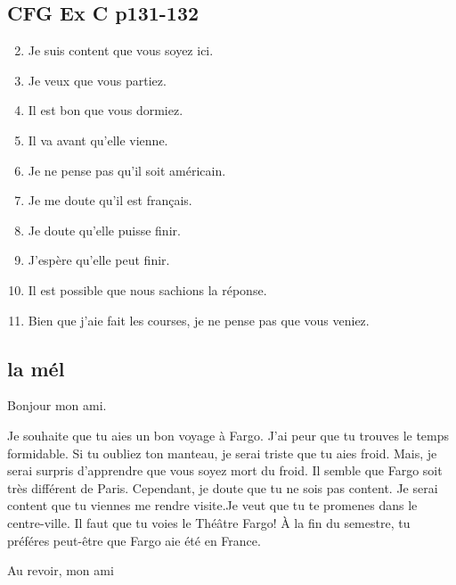 \documentclass[letterpaper]{article}
\begin{document}
\doublespacing
\subsection*{CFG Ex C p131-132}
\begin{enumerate}
\setcounter{enumi}{1}
\item
Je suis content que vous soyez ici.
\setcounter{enumi}{3}
\item
Je veux que vous partiez.
\setcounter{enumi}{5}
\item
Il est bon que vous dormiez.
\setcounter{enumi}{9}
\item
Il va avant qu'elle vienne.
\item
Je ne pense pas qu'il soit américain.
\item
Je me doute qu'il est français.
\item
Je doute qu'elle puisse finir.
\item
J'espère qu'elle peut finir.
\item
Il est possible que nous sachions la réponse.
\setcounter{enumi}{17}
\item
Bien que j'aie fait les courses, je ne pense pas que vous veniez. 
\end{enumerate}

\subsection*{la mél}
Bonjour mon ami.

Je souhaite que tu  aies un bon voyage à Fargo. J'ai peur que tu trouves le temps formidable. Si tu oubliez ton manteau, je serai triste que tu aies froid. Mais, je serai surpris d'apprendre que vous soyez mort du froid. Il semble que Fargo soit très différent de Paris. Cependant, je doute que tu ne sois pas content. Je serai content que tu viennes me rendre visite.Je veut que tu te promenes dans le centre-ville. Il faut que tu voies le Théâtre Fargo! À la fin du semestre, tu préféres peut-être que Fargo aie été en France.

Au revoir, mon ami
\end{document}
